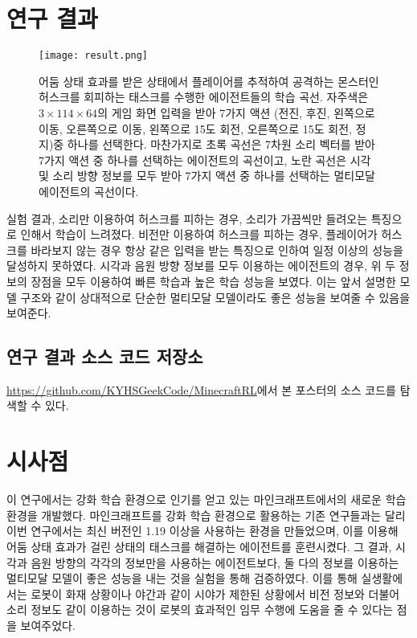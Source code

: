 \documentclass{tudelftposter}
\begin{document}
\section{연구 결과}

\begin{figure}
  \centering
  \texttt{[image: result.png]}
  \caption{어둠 상태 효과를 받은 상태에서 플레이어를 추적하여 공격하는 몬스터인 허스크를 회피하는 태스크를 수행한 에이전트들의 학습 곡선. 자주색은 $3\times114\times64$의 게임 화면 입력을 받아 7가지 액션 (전진, 후진, 왼쪽으로 이동, 오른쪽으로 이동, 왼쪽으로 15도 회전, 오른쪽으로 15도 회전, 정지)중 하나를 선택한다. 마찬가지로 초록 곡선은 7차원 소리 벡터를 받아 7가지 액션 중 하나를 선택하는 에이전트의 곡선이고, 노란 곡선은 시각 및 소리 방향 정보를 모두 받아 7가지 액션 중 하나를 선택하는 멀티모달 에이전트의 곡선이다.}
  \label{fig:block}
\end{figure}
실험 결과, 소리만 이용하여 허스크를 피하는 경우, 소리가 가끔씩만 들려오는 특징으로 인해서 학습이 느려졌다. 비전만 이용하여 허스크를 피하는 경우, 플레이어가 허스크를 바라보지 않는 경우 항상 같은 입력을 받는 특징으로 인하여 일정 이상의 성능을 달성하지 못하였다. 시각과 음원 방향 정보를 모두 이용하는 에이전트의 경우, 위 두 정보의 장점을 모두 이용하여 빠른 학습과 높은 학습 성능을 보였다. 이는 앞서 설명한 모델 구조와 같이 상대적으로 단순한 멀티모달 모델이라도 좋은 성능을 보여줄 수 있음을 보여준다.

\subsection{연구 결과 소스 코드 저장소}
\href{https://github.com/KYHSGeekCode/MinecraftRL}{https://github.com/KYHSGeekCode/MinecraftRL}에서 본 포스터의 소스 코드를 탐색할 수 있다.


\section{시사점}
이 연구에서는 강화 학습 환경으로 인기를 얻고 있는 마인크래프트에서의 새로운 학습 환경을 개발했다. 마인크래프트를 강화 학습 환경으로 활용하는 기존 연구들과는 달리 이번 연구에서는 최신 버전인 1.19 이상을 사용하는 환경을 만들었으며, 이를 이용해 어둠 상태 효과가 걸린 상태의 태스크를 해결하는 에이전트를 훈련시켰다. 그 결과, 시각과 음원 방향의 각각의 정보만을 사용하는 에이전트보다, 둘 다의 정보를 이용하는 멀티모달 모델이 좋은 성능을 내는 것을 실험을 통해 검증하였다. 이를 통해 실생활에서는 로봇이 화재 상황이나 야간과 같이 시야가 제한된 상황에서 비전 정보와 더불어 소리 정보도 같이 이용하는 것이 로봇의 효과적인 임무 수행에 도움을 줄 수 있다는 점을 보여주었다.

% 
\end{document}
